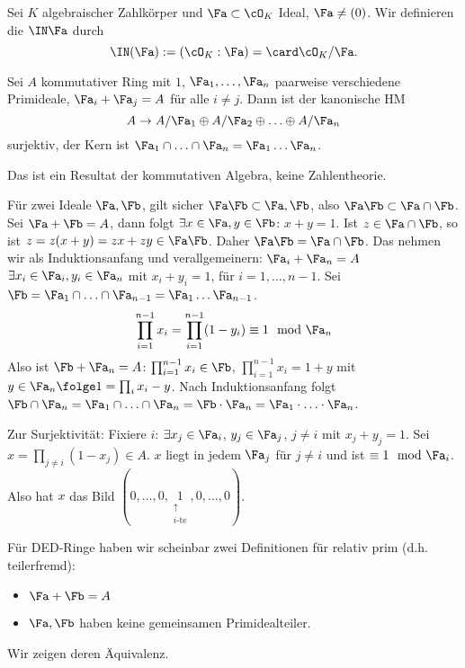  \begin{Definition}
  Sei $K$ algebraischer Zahlkörper und $\Fa\subset \cO_K$ Ideal, $\Fa\neq(0)$. Wir definieren die  $\IN\Fa$ durch \[\IN(\Fa):=(\cO_K:\Fa)=\card \cO_K/\Fa.\]
 \end{Definition}
 
 \begin{Fakt}
  Sei $A$ kommutativer Ring mit $1$, $\Fa_1,\ldots,\Fa_n$ paarweise verschiedene Primideale, $\Fa_i+\Fa_j=A$ für alle $i\neq j$.
  Dann ist der kanonische HM
  \[A\rightarrow A/\Fa_1 \oplus A/\Fa_2 \oplus \ldots \oplus A/\Fa_n \]
  surjektiv, der Kern ist $\Fa_1\cap\ldots\cap \Fa_n=\Fa_1\ldots\Fa_n$.
 \end{Fakt}

\begin{Bemerkung}
 Das ist ein Resultat der kommutativen Algebra, keine Zahlentheorie.
\end{Bemerkung}

\begin{Beweis}
 Für zwei Ideale $\Fa,\Fb$, gilt sicher $\Fa\Fb\subset\Fa,\Fb$, also $\Fa\Fb\subset\Fa\cap\Fb$.
 Sei $\Fa+\Fb=A$, dann folgt $\exists x\in \Fa, y\in\Fb$: $x+y=1$. Ist $z\in \Fa\cap\Fb$, so ist $z=z(x+y)=zx+zy\in\Fa\Fb$.
 Daher $\Fa\Fb=\Fa\cap\Fb$. Das nehmen wir als Induktionsanfang und verallgemeinern: $\Fa_i+\Fa_n=A$ \folge $\exists x_i\in\Fa_i, y_i\in\Fa_n$ mit $x_i+y_i=1$, für $i=1,\ldots,n-1$. Sei $\Fb=\Fa_1\cap\ldots\cap\Fa_{n-1}=\Fa_1\ldots\Fa_{n-1}$.
 \[\prod_{i=1}^{n-1} x_i = \prod_{i=1}^{n-1}(1-y_i)\equiv 1\mod{\Fa_n} \]
 Also ist $\Fb+\Fa_n=A$: $\prod_{i=1}^{n-1} x_i\in\Fb$, $\prod_{i=1}^{n-1}  x_i=1+y$ mit $y\in\Fa_n \folge 1=\prod_i x_i-y$. Nach Induktionsanfang folgt $\Fb\cap \Fa_n=\Fa_1\cap\ldots\cap\Fa_n=\Fb\cdot\Fa_n=\Fa_1\cdot\ldots\cdot\Fa_n$.
 
 Zur Surjektivität: Fixiere $i$: $\exists x_j\in\Fa_i$, $y_j\in\Fa_j$, $j\neq i$ mit $x_j+y_j=1$. Sei $x=\prod_{j\neq i} (1-x_j)\in A$. $x$ liegt in jedem $\Fa_j$ für $j\neq i$ und ist $\equiv 1 \mod{\Fa_i}$.
 Also hat $x$ das Bild $(0,\ldots,0,\underset{\substack{\uparrow\\i\text{-te}}}{1},0,\ldots,0)$.
\end{Beweis}

\begin{Bemerkung}
 Für DED-Ringe haben wir scheinbar zwei Definitionen für relativ prim (d.h. teilerfremd):
 \begin{itemize}
  \item $\Fa+\Fb=A$
  \item $\Fa,\Fb$ haben keine gemeinsamen Primidealteiler.
 \end{itemize}
 Wir zeigen deren Äquivalenz.
\end{Bemerkung}

